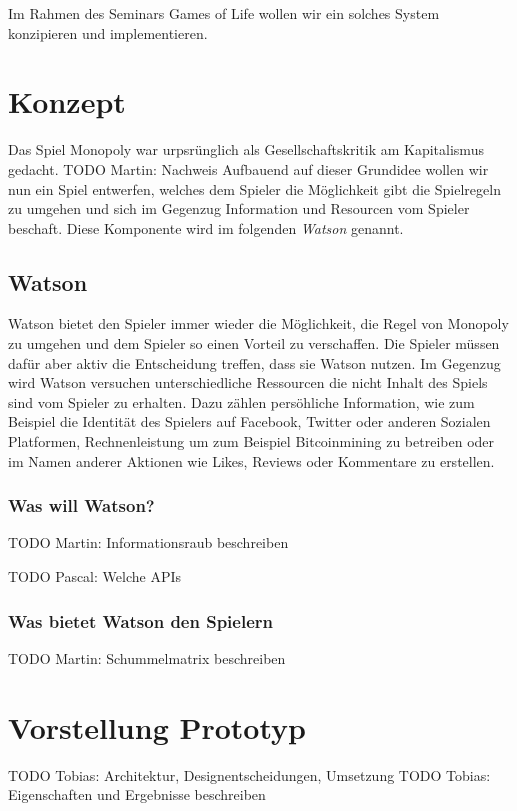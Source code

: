 \documentclass[german]{cgspaper} %
\newcommand{\Martin}[1]{ \textcolor{colorMartin}{TODO Martin:} #1 }
\newcommand{\Pascal}[1]{ \textcolor{colorPascal}{TODO Pascal:} #1 }
\newcommand{\Tobias}[1]{ \textcolor{colorTobias}{TODO Tobias:} #1 }
\newcommand{\neuerBegriff}[1]{\textit{#1}}
\begin{document}
Im Rahmen des Seminars Games of Life wollen wir ein solches System konzipieren und implementieren.

\section{Konzept}

Das Spiel Monopoly war urpsrünglich als Gesellschaftskritik am Kapitalismus gedacht. \Martin{Nachweis} 
Aufbauend auf dieser Grundidee wollen wir nun ein Spiel entwerfen, welches dem Spieler die Möglichkeit gibt die Spielregeln zu umgehen und sich im Gegenzug Information und Resourcen vom Spieler beschaft. 
Diese Komponente wird im folgenden \neuerBegriff{Watson} genannt.

\subsection{Watson}

Watson bietet den Spieler immer wieder die Möglichkeit, die Regel von Monopoly zu umgehen und dem Spieler so einen Vorteil zu verschaffen.
Die Spieler müssen dafür aber aktiv die Entscheidung treffen, dass sie Watson nutzen.
Im Gegenzug wird Watson versuchen unterschiedliche Ressourcen die nicht Inhalt des Spiels sind vom Spieler zu erhalten.
Dazu zählen persöhliche Information, wie zum Beispiel die Identität des Spielers auf Facebook, Twitter oder anderen Sozialen Platformen, Rechnenleistung um zum Beispiel Bitcoinmining zu betreiben oder im Namen anderer Aktionen wie Likes, Reviews oder Kommentare zu erstellen.

\subsubsection{Was will Watson?}

\Martin{Informationsraub beschreiben}

\Pascal{Welche APIs}

\subsubsection{Was bietet Watson den Spielern}

\Martin{Schummelmatrix beschreiben}

\section{Vorstellung Prototyp}

\Tobias{Architektur, Designentscheidungen, Umsetzung}
\Tobias{Eigenschaften und Ergebnisse beschreiben}
\end{document}
